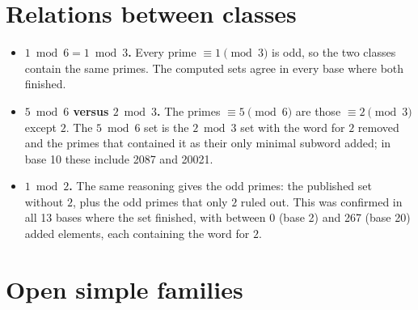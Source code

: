 \documentclass[11pt]{article}
\begin{document}
\section{Relations between classes}

\begin{itemize}
\item \textbf{$1 \bmod 6 = 1 \bmod 3$.} Every prime $\equiv 1 \pmod 3$ is odd, so the two classes contain the same primes. The computed sets agree in every base where both finished.
\item \textbf{$5 \bmod 6$ versus $2 \bmod 3$.} The primes $\equiv 5 \pmod 6$ are those $\equiv 2 \pmod 3$ except $2$. The $5 \bmod 6$ set is the $2 \bmod 3$ set with the word for $2$ removed and the primes that contained it as their only minimal subword added; in base 10 these include 2087 and 20021.
\item \textbf{$1 \bmod 2$.} The same reasoning gives the odd primes: the published set without $2$, plus the odd primes that only $2$ ruled out. This was confirmed in all 13 bases where the set finished, with between 0 (base 2) and 267 (base 20) added elements, each containing the word for $2$.
\end{itemize}

\section{Open simple families}
\end{document}
